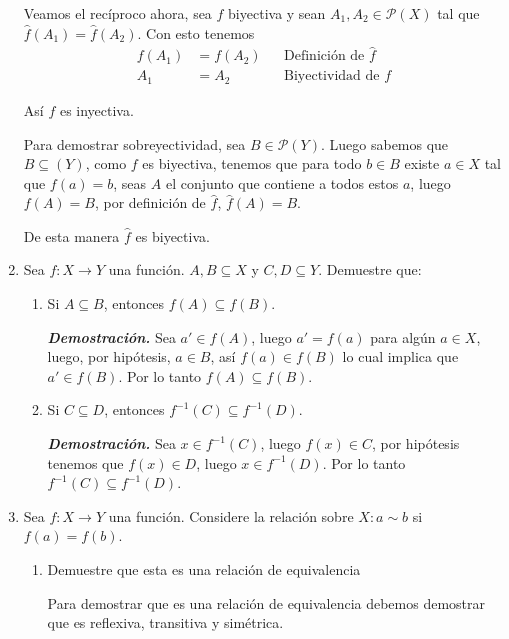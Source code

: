 \documentclass{report}
\begin{document}
\begin{enumerate}
    Veamos el recíproco ahora, sea $f$ biyectiva y sean $A_1, A_2 \in \mathcal{P}(X)$ tal que $\hat{f}(A_1) = \hat{f}(A_2)$. Con esto tenemos
    \begin{align*}
        f(A_1) &= f(A_2) && \text{Definición de } \hat{f}\\
        A_1 &= A_2 && \text{Biyectividad de } f
    \end{align*}

    Así $f$ es inyectiva.

    Para demostrar sobreyectividad, sea $B \in \mathcal{P}(Y)$. Luego sabemos que $B \subseteq(Y)$, como $f$ es biyectiva, tenemos que para todo $b \in B$ existe $a \in X$ tal que $f(a) = b$, seas $A$ el conjunto que contiene a todos estos $a$, luego $f(A) = B$, por definición de $\hat{f}$, $\hat{f}(A) = B$.

    De esta manera $\hat{f}$ es biyectiva.

    \item Sea $f: X \to Y$ una función. $A, B \subseteq X$ y $C, D \subseteq Y$. Demuestre que:

    \begin{enumerate}
        \item Si $A \subseteq B$, entonces $f(A) \subseteq f(B)$.

        \textit{\textbf{Demostración.}} Sea $a' \in f(A)$, luego $a' = f(a)$ para algún $a \in X$, luego, por hipótesis, $a \in B$, así $f(a) \in f(B)$ lo cual implica que $a' \in f(B)$. Por lo tanto $f(A) \subseteq f(B)$.

        \item Si $C \subseteq D$, entonces $f^{-1}(C) \subseteq f^{-1}(D)$.

        \textit{\textbf{Demostración.}} Sea $x \in f^{-1}(C)$, luego $f(x) \in C$, por hipótesis tenemos que $f(x) \in D$, luego $x \in f^{-1}(D)$. Por lo tanto $f^{-1}(C) \subseteq f^{-1}(D)$.
    \end{enumerate}

    \item Sea $f: X \to Y$ una función. Considere la relación sobre $X: a \sim b$ si $f(a) = f(b)$.

    \begin{enumerate}
        \item Demuestre que esta es una relación de equivalencia

        Para demostrar que es una relación de equivalencia debemos demostrar que es reflexiva, transitiva y simétrica.


\end{enumerate}
\end{enumerate}
\end{document}
